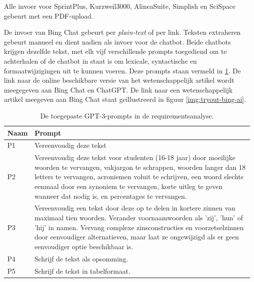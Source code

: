 \medspace


Alle invoer voor SprintPlus, Kurzweil3000, AlineaSuite, Simplish en SciSpace gebeurt met een PDF-upload.

\medspace

De invoer van Bing Chat gebeurt per \textit{plain-text} of per link. Teksten extraheren gebeurt manueel en dient nadien als invoer voor de chatbot. Beide chatbots krijgen dezelfde tekst, met elk vijf verschillende prompts toegediend om te achterhalen of de chatbot in staat is om lexicale, syntactische en formaatwijzigingen uit te kunnen voeren. Deze prompts staan vermeld in \ref{table:tested-prompts-requirementsanalysis}. De link naar de online beschikbare versie van het wetenschappelijk artikel wordt meegegeven aan Bing Chat en ChatGPT. De link naar een wetenschappelijk artikel meegeven aan Bing Chat staat geïllustreerd in figuur \ref{img:tryout-bing-ai}.

\begin{center}
	\begin{table}[H]
		\begin{tabular}{ | m{2cm} | m{14cm} | } 
			\hline
			\textbf{Naam} & \textbf{Prompt} \\
			\hline
			P1 & Vereenvoudig deze tekst \\
			\hline
			P2 & Vereenvoudig deze tekst voor studenten (16-18 jaar) door moeilijke woorden te vervangen, vakjargon te schrappen, woorden langer dan 18 letters te vervangen, acroniemen voluit te schrijven, een woord slechts eenmaal door een synoniem te vervangen, korte uitleg te geven wanneer dat nodig is, en percentages te vervangen. \\
			\hline
			P3 & Vereenvoudig een tekst door deze op te delen in kortere zinnen van maximaal tien woorden. Verander voornaamwoorden als 'zij', 'hun' of 'hij' in namen. Vervang complexe zinsconstructies en voorzetselzinnen door eenvoudiger alternatieven, maar laat ze ongewijzigd als er geen eenvoudiger optie beschikbaar is. \\
			\hline
			P4 & Schrijf de tekst als opsomming. \\
			\hline
			P5 & Schrijf de tekst in tabelformaat. \\
			\hline
		\end{tabular}
		\label{table:tested-prompts-requirementsanalysis}
		\caption{De toegepaste GPT-3-prompts in de requirementsanalyse.}
	\end{table}
\end{center}

